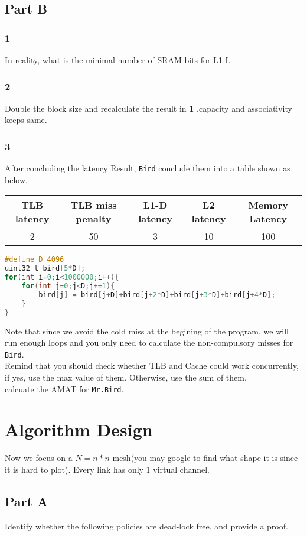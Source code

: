 \documentclass{article}
\begin{document}
\subsection*{Part B}
\subsubsection*{1}
In reality, what is the minimal number of SRAM bits for L1-I.
\subsubsection*{2}
Double the block size and recalculate the result in \textbf{1} ,capacity and associativity keeps same.
\subsubsection*{3}
After concluding the latency Result, \texttt{Bird} conclude them into a table shown as below.
\begin{table}[H]
\centering
\begin{tabular}{|c|c|c|c|c|}
\hline
TLB latency & TLB miss penalty & L1-D latency & L2 latency & Memory Latency \\
\hline
2  & 50  & 3 & 10 & 100 \\
\hline
\end{tabular}
\end{table}
\begin{lstlisting}[language=C]
#define D 4096
uint32_t bird[5*D];
for(int i=0;i<1000000;i++){
    for(int j=0;j<D;j+=1){
        bird[j] = bird[j+D]+bird[j+2*D]+bird[j+3*D]+bird[j+4*D];
    }
}
\end{lstlisting}
Note that since we avoid the cold miss at the begining of the program, we will run enough loops and you only need to calculate the non-compulsory misses for \texttt{Bird}.\\
Remind that you should check whether TLB and Cache could work concurrently, if yes, use the max value of them. Otherwise, use the sum of them.\\
calcuate the AMAT for \texttt{Mr.Bird}.
\section*{Algorithm Design}
Now we focus on a $N=n*n$ mesh(you may google to find what shape it is since it is hard to plot). Every link has only 1 virtual channel.
\subsection*{Part A}
Identify whether the following policies are dead-lock free, and provide a proof.\\
\end{document}
